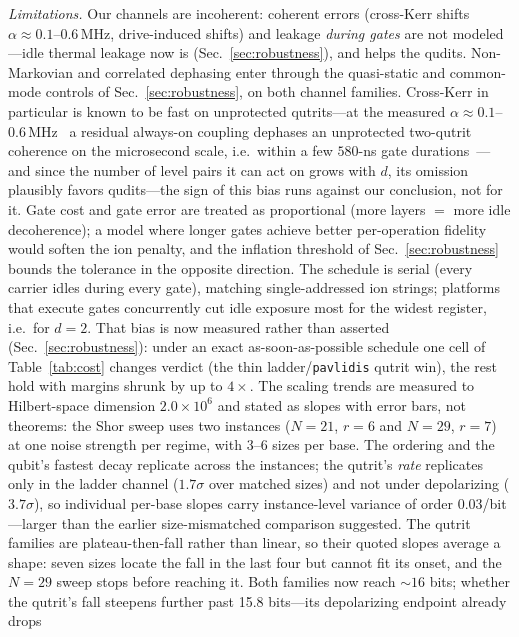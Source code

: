 \documentclass[aps,pra,reprint,superscriptaddress,nofootinbib,floatfix]{revtex4-2}
\begin{document}
\emph{Limitations.} Our channels are incoherent: coherent
errors (cross-Kerr shifts $\alpha\approx0.1$--$0.6$\,MHz, drive-induced
shifts) and leakage \emph{during gates} are not modeled---idle
thermal leakage now is (Sec.~\ref{sec:robustness}), and helps the
qudits. Non-Markovian and correlated dephasing enter through the
quasi-static and common-mode controls of Sec.~\ref{sec:robustness},
on both channel families.
Cross-Kerr in particular is known to be fast on unprotected
qutrits---at the measured $\alpha\approx0.1$--$0.6$\,MHz~\cite{goss2024}
a residual
always-on coupling dephases an unprotected two-qutrit coherence on
the microsecond scale, i.e.\ within a few $580$-ns gate
durations~\cite{goss2022}---and since the number of level pairs it
can act on grows with $d$, its omission plausibly favors qudits---the
sign of this bias runs against our conclusion, not for it. Gate cost
and gate error are treated as proportional (more layers $=$ more idle
decoherence); a model where longer gates achieve better per-operation
fidelity would soften the ion penalty, and the inflation threshold of
Sec.~\ref{sec:robustness} bounds the tolerance in the opposite
direction. The schedule is serial (every carrier idles during every
gate), matching single-addressed ion strings; platforms that execute
gates concurrently cut idle exposure most for the widest register,
i.e.\ for $d=2$. That bias is now measured rather than asserted
(Sec.~\ref{sec:robustness}): under an exact as-soon-as-possible
schedule one cell of Table~\ref{tab:cost} changes verdict (the thin
ladder/\texttt{pavlidis} qutrit win), the rest hold with
margins shrunk by up to $4\times$. The scaling trends are measured
to Hilbert-space dimension $2.0\times10^{6}$ and stated as slopes with error
bars, not theorems: the
Shor sweep uses two instances ($N=21$, $r=6$ and $N=29$, $r=7$) at one
noise strength per regime, with 3--6 sizes per base. The ordering and
the qubit's fastest decay replicate across the instances; the
qutrit's \emph{rate} replicates only in the ladder channel
($1.7\sigma$ over matched sizes) and not under depolarizing
($3.7\sigma$), so individual per-base slopes carry instance-level
variance of order $0.03$/bit---larger than the earlier
size-mismatched comparison suggested. The qutrit families are
plateau-then-fall rather than linear, so their quoted slopes average a
shape: seven sizes locate the fall in the last four but cannot fit its
onset, and the $N=29$ sweep stops before reaching it. Both families
now reach ${\sim}16$ bits; whether the qutrit's fall steepens
further past 15.8 bits---its depolarizing endpoint already drops
\end{document}
